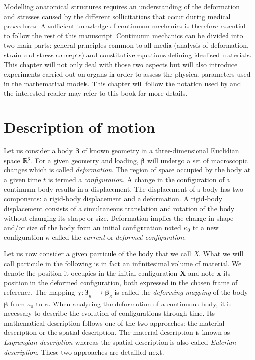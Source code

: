 Modelling anatomical structures requires an understanding of the deformation and stresses caused by the different sollicitations that occur during medical procedures. A sufficient knowledge of continuum mechanics is therefore essential to follow the rest of this manuscript. Continuum mechanics can be divided into two main parts: general principles common to all media (analysis of deformation, strain and stress concepts) and constitutive equations defining idealised materials. This chapter will not only deal with those two aspects but will also introduce experiments carried out on organs in order to assess the physical parameters used in the mathematical models. This chapter will follow the notation used by \cite{Reddy07} and the interested reader may refer to this book for more details.  


\section{Description of motion}
Let us consider a body $\boldsymbol \beta$ of known geometry in a three-dimensional Euclidian space $\mathbb{R}^3$. For a given geometry and loading, $\boldsymbol \beta$ will undergo a set of macroscopic changes which is called \emph{deformation}. The region of space occupied by the body at a given time $t$ is termed a \emph{configuration}. A change in the configuration of a continuum body results in a displacement. The displacement of a body has two components: a rigid-body displacement and a deformation. A rigid-body displacement consists of a simultaneous translation and rotation of the body without changing its shape or size. Deformation implies the change in shape and/or size of the body from an initial configuration noted $\kappa_{0}$ to a new configuration $\kappa$ called the \emph{current} or \emph{deformed configuration}. 

Let us now consider a given particule of the body that we call $X$. What we will call particule in the following is in fact an infinitesimal volume of material. We denote the position it occupies in the initial configuration $\textbf{X}$ and note $\textbf{x}$ its position in the deformed configuration, both expressed in the chosen frame of reference. The mapping $\chi : \boldsymbol \beta_{\kappa_{0}} \rightarrow \boldsymbol \beta_{\kappa}$ is called the \emph{deforming mapping} of the body $\boldsymbol \beta$ from $\kappa_{0}$ to $\kappa$. When analysing the deformation of a continuous body, it is necessary to describe the evolution of configurations through time. Its mathematical description follows one of the two approaches: the material description or the spatial description. The material description is known as \emph{Lagrangian description} whereas the spatial description is also called \emph{Eulerian description}. These two approaches are detailled next. 

